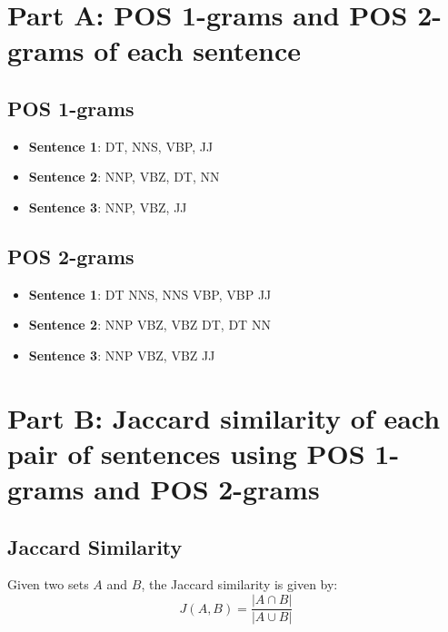\documentclass{article}
\begin{document}
\section*{Part A: POS 1-grams and POS 2-grams of each sentence}

\subsection*{POS 1-grams}
\begin{itemize}
    \item \textbf{Sentence 1}: DT, NNS, VBP, JJ
    \item \textbf{Sentence 2}: NNP, VBZ, DT, NN
    \item \textbf{Sentence 3}: NNP, VBZ, JJ
\end{itemize}

\subsection*{POS 2-grams}
\begin{itemize}
    \item \textbf{Sentence 1}: DT NNS, NNS VBP, VBP JJ
    \item \textbf{Sentence 2}: NNP VBZ, VBZ DT, DT NN
    \item \textbf{Sentence 3}: NNP VBZ, VBZ JJ
\end{itemize}

\section*{Part B: Jaccard similarity of each pair of sentences using POS 1-grams and POS 2-grams}

\subsection*{Jaccard Similarity}
Given two sets \( A \) and \( B \), the Jaccard similarity is given by:
\[
J(A, B) = \frac{|A \cap B|}{|A \cup B|}
\]
\end{document}
